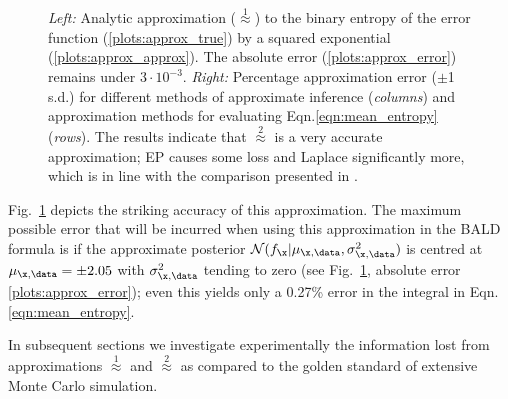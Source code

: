 \begin{figure}

	\caption[Taylor series approximation to the value of information in GP classification]{\emph{Left:} Analytic approximation ({\scriptsize $\stackrel{1}{\approx}$}) to the binary entropy of the error function (\ref{plots:approx_true}) by a squared exponential (\ref{plots:approx_approx}). The absolute error (\ref{plots:approx_error}) remains under $3\cdot 10^{-3}$. \emph{Right:} Percentage approximation error ($\pm$1 s.d.) for different methods of approximate inference (\emph{columns}) and approximation methods for evaluating Eqn.\eqref{eqn:mean_entropy} (\emph{rows}). The results indicate that {\scriptsize $\stackrel{2}{\approx}$} is a very accurate approximation; EP causes some loss and Laplace significantly more, which is in line with the comparison presented in \citep{Kuss05}. }\label{fig:trick}
\end{figure}

Fig.\ \ref{fig:trick} depicts the striking accuracy of this approximation. The maximum possible error that will be incurred when using this approximation in the BALD formula is if the approximate posterior $\mathcal{N}(f_{\x}\vert \mu_{\x,\data},\sigma_{\x,\data}^2)$ is centred at $\mu_{\x,\data}=\pm 2.05$  with $\sigma_{\x,\data}^2$ tending to zero (see Fig.\ \ref{fig:trick}, absolute error \ref{plots:approx_error}); even this yields only a 0.27\% error in the integral in Eqn.\eqref{eqn:mean_entropy}.

In subsequent sections we investigate experimentally the information lost from approximations {\scriptsize $\stackrel{1}{\approx}$} and {\scriptsize $\stackrel{2}{\approx}$} as compared to the golden standard of extensive Monte Carlo simulation.

